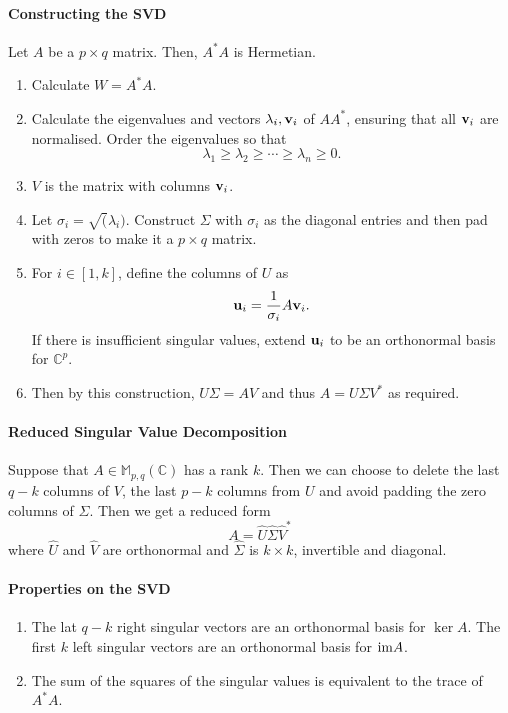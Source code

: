 \paragraph{Constructing the SVD}

Let \( A \) be a \( p \times q \) matrix.  Then, \( A^* A  \) is Hermetian.

\begin{enumerate}
    \item Calculate \( W = A^* A \).
    \item Calculate the eigenvalues and vectors \( \lambda_i, \mathbf{v}_i \)
        of \( A A^* \), ensuring that all \( \mathbf{v}_i \) are normalised.
        Order the eigenvalues so that \[
            \lambda_1 \geq \lambda_2 \geq\cdots \geq \lambda_n \geq 0
        .\]
    \item \( V \) is the matrix with columns \( \mathbf{v}_i \).
    \item Let \( \sigma_i = \sqrt(\lambda_i) \). Construct \( \Sigma \)
        with \( \sigma_i \) as the diagonal entries and then pad
        with zeros to make it a \( p \times q \) matrix.
    \item For \( i \in [1, k] \), define the columns of \( U \) as \[
        \mathbf{u}_i = \frac{1}{\sigma_i} A \mathbf{v}_i
    .\]
    If there is insufficient singular values, extend \( \mathbf{u}_i \)
    to be an orthonormal basis for \( \mathbb{C}^p \).
    \item Then by this construction, \( U \Sigma = A V \) and thus
        \( A = U \Sigma V^* \) as required.
\end{enumerate}

\paragraph{Reduced Singular Value Decomposition}
Suppose that \( A \in \mathbb{M}_{p, q} (\mathbb{C}) \)
has a rank \( k \). Then we can choose to delete the last
\( q - k \) columns of \( V \), the last \( p - k \) columns
from \( U \) and avoid padding the zero columns of \( \Sigma \).
Then we get a reduced form \[
    A = \hat{U} \hat{\Sigma} \hat{V}^*
\]
where \( \hat{U} \) and \( \hat{V} \) are orthonormal
and \( \hat{\Sigma} \) is \( k\times k \), invertible
and diagonal.

\paragraph{Properties on the SVD}
\begin{enumerate}
    \item The lat \( q - k \) right singular vectors
    are an orthonormal basis for \( \ker A \).
    The first \( k \) left singular vectors are an orthonormal
    basis for \( \mathrm{im} A \).
    \item The sum of the squares of the singular values is
    equivalent to the trace of \( A^* A \).
\end{enumerate}

